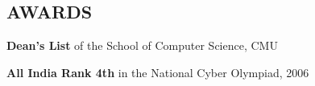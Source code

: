 \documentclass[margin, 11pt]{res} %
\begin{document}
\begin{resume}

\section{AWARDS}

{\bf Dean's List} of the School of Computer Science, CMU

\vspace{5pt}

{\bf All India Rank 4th} in the National Cyber Olympiad, 2006


\end{resume}
\end{document}
